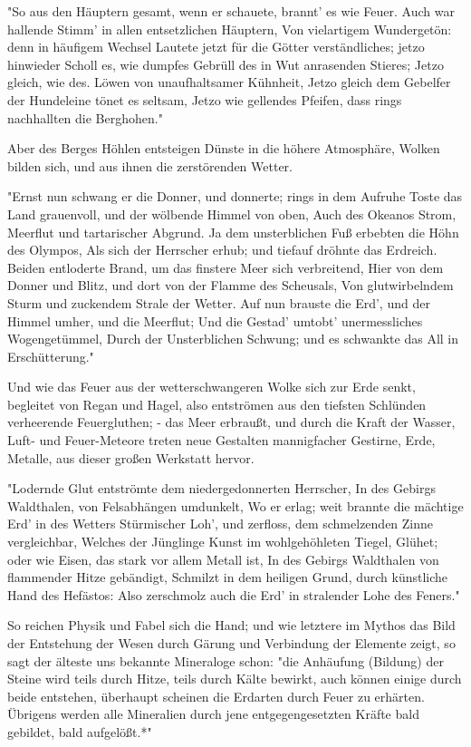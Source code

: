 \documentclass[a4paper, 11pt, oneside, polutonikogreek, german]{article}
\begin{document}
"So aus den Häuptern gesamt, wenn er schauete, brannt' es wie Feuer. Auch war hallende Stimm' in allen entsetzlichen Häuptern, Von vielartigem Wundergetön: denn in häufigem Wechsel Lautete jetzt für die Götter verständliches; jetzo hinwieder Scholl es, wie dumpfes Gebrüll des in Wut anrasenden Stieres; Jetzo gleich, wie des. Löwen von unaufhaltsamer Kühnheit, Jetzo gleich dem Gebelfer der Hundeleine tönet es seltsam, Jetzo wie gellendes Pfeifen, dass rings nachhallten die Berghohen."

Aber des Berges Höhlen entsteigen Dünste in die höhere Atmosphäre, Wolken bilden sich, und aus ihnen die zerstörenden Wetter.

"Ernst nun schwang er die Donner, und donnerte; rings in dem Aufruhe Toste das Land grauenvoll, und der wölbende Himmel von oben, Auch des Okeanos Strom, Meerflut und tartarischer Abgrund. Ja dem unsterblichen Fuß erbebten die Höhn des Olympos, Als sich der Herrscher erhub; und tiefauf dröhnte das Erdreich. Beiden entloderte Brand, um das finstere Meer sich verbreitend, Hier von dem Donner und Blitz, und dort von der Flamme des Scheusals, Von glutwirbelndem Sturm und zuckendem Strale der Wetter. Auf nun brauste die Erd', und der Himmel umher, und die Meerflut; Und die Gestad' umtobt' unermessliches Wogengetümmel, Durch der Unsterblichen Schwung; und es schwankte das All in Erschütterung."

Und wie das Feuer aus der wetterschwangeren Wolke sich zur Erde senkt, begleitet von Regan und Hagel, also entströmen aus den tiefsten Schlünden verheerende Feuergluthen; - das Meer erbraußt, und durch die Kraft der Wasser, Luft- und Feuer-Meteore treten neue Gestalten mannigfacher Gestirne, Erde, Metalle, aus dieser großen Werkstatt hervor.

"Lodernde Glut entströmte dem niedergedonnerten Herrscher, In des Gebirgs Waldthalen, von Felsabhängen umdunkelt, Wo er erlag; weit brannte die mächtige Erd' in des Wetters Stürmischer Loh', und zerfloss, dem schmelzenden Zinne vergleichbar, Welches der Jünglinge Kunst im wohlgehöhleten Tiegel, Glühet; oder wie Eisen, das stark vor allem Metall ist, In des Gebirgs Waldthalen von flammender Hitze gebändigt, Schmilzt in dem heiligen Grund, durch künstliche Hand des Hefästos: Also zerschmolz auch die Erd' in stralender Lohe des Feners."

So reichen Physik und Fabel sich die Hand; und wie letztere im Mythos das Bild der Entstehung der Wesen durch Gärung und Verbindung der Elemente zeigt, so sagt der älteste uns bekannte Mineraloge schon: "die Anhäufung (Bildung) der Steine wird teils durch Hitze, teils durch Kälte bewirkt, auch können einige durch beide entstehen, überhaupt scheinen die Erdarten durch Feuer zu erhärten. Übrigens werden alle Mineralien durch jene entgegengesetzten Kräfte bald gebildet, bald aufgelößt.*"
\end{document}
